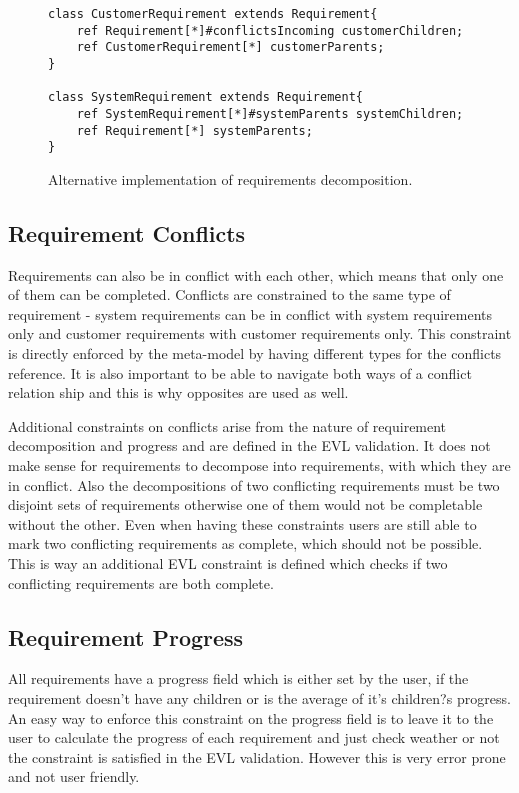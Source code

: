 \documentclass[11pt,a4paper]{scrartcl}
\begin{document}
	\begin{figure}[h!]
	\centering
	\begin{lstlisting}
class CustomerRequirement extends Requirement{
	ref Requirement[*]#conflictsIncoming customerChildren;
	ref CustomerRequirement[*] customerParents;
}
	
class SystemRequirement extends Requirement{
	ref SystemRequirement[*]#systemParents systemChildren;
	ref Requirement[*] systemParents;
}
	\end{lstlisting}
	
	\caption{Alternative implementation of requirements decomposition.}
	\label{fig:alt-req}
	
	\end{figure}
	

	\subsection{Requirement Conflicts}
	Requirements can also be in conflict with each other, which means that only one of them can be completed. Conflicts are constrained to the same type of requirement - system requirements can be in conflict with system requirements only and customer requirements with customer requirements only. This constraint is directly enforced by the meta-model by having different types for the conflicts reference. It is also important to be able to navigate both ways of a conflict relation ship and this is why opposites are used as well. 
	
	Additional constraints on conflicts arise from the nature of requirement decomposition and progress and are defined in the EVL validation. It does not make sense for requirements to decompose into requirements, with which they are in conflict. Also the decompositions of two conflicting requirements must be two disjoint sets of requirements otherwise one of them would not be completable without the other. Even when having these constraints users are still able to mark two conflicting requirements as complete, which should not be possible. This is way an additional EVL constraint is defined which checks if two conflicting requirements are both complete.
	
	\subsection{Requirement Progress}
	All requirements have a progress field which is either set by the user, if the requirement doesn't have any children or is the average of it's children?s progress. An easy way to enforce this constraint on the progress field is to leave it to the user to calculate the progress of each requirement and just check weather or not the constraint is satisfied in the EVL validation. However this is very error prone and not user friendly. 
	
\end{document}
